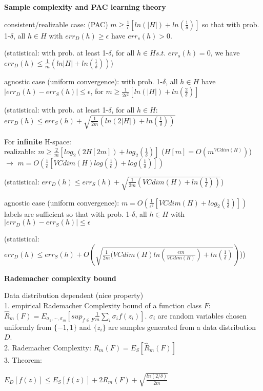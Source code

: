 \documentclass{article}
\begin{document}
\noindent
\textbf{Sample complexity and PAC learning theory}

consistent/realizable case: (PAC) $m \geq \frac{1}{\epsilon} [ln(|H|) + ln(\frac{1}{\delta})]$ so that with prob. 1-$\delta$, all $h \in H$ with $err_D(h) \geq \epsilon$ have $err_s(h) > 0$.

(statistical: with prob. at least 1-$\delta$, for all $h \in H s.t. $ $err_s(h)=0$, we have $err_D(h) \leq \frac{1}{m}(ln|H| + ln(\frac{1}{\delta}))$)

\noindent
agnostic case (uniform convergence): with prob. 1-$\delta$, all $h \in H$ have $|err_D(h)-err_S(h)| \leq \epsilon$, for $m \geq \frac{1}{2\epsilon^2}[ln(|H|) + ln(\frac{2}{\delta})]$

(statistical: with prob. at least 1-$\delta$, for all $h \in H$: $err_D(h) \leq err_S(h) + \sqrt{\frac{1}{2m}(ln(2|H|) + ln(\frac{1}{\delta}))}$

For \textbf{infinite} H-space:\\
realizable: $m \geq \frac{2}{m}[log_2(2H[2m]) + log_2(\frac{1}{\delta})]$ ($H[m] = O(m^{VCdim(H)})$) $\rightarrow$ $m=O(\frac{1}{\epsilon}[VCdim(H)log(\frac{1}{\epsilon}) + log(\frac{1}{\delta})])$

(statistical: $err_D(h) \leq err_S(h) + \sqrt{\frac{1}{2m}(VCdim(H) + ln(\frac{1}{\delta}))}$)

\noindent
agnostic case (uniform convergence): $m = O( \frac{1}{\epsilon^2}[VCdim(H) + log_2(\frac{1}{\delta})])$ labels are sufficient so that with prob. 1-$\delta$, all $h \in H$ with $|err_D(h)-err_S(h)| \leq \epsilon$

(statistical: $err_D(h) \leq err_S(h) + O(\sqrt{\frac{1}{2m}(VCdim(H)ln(\frac{em}{VCdim(H)}) + ln(\frac{1}{\delta})})$))

\noindent
\textbf{Rademacher complexity bound}

Data distribution dependent (nice property) \\
 1. empirical Rademacher Complexity bound of a function class $F$: $\hat{R}_m(F) = E_{\sigma_1, \cdots, \sigma_m}[sup_{f \in F} \frac{1}{m} \sum_{i} \sigma_i f(z_i)]$.  $\sigma_i$ are random variables chosen uniformly from $\{-1,1\}$ and $\{z_i\}$ are samples generated from a data distribution $D$. \\
 2. Rademacher Complexity: $R_m(F) = E_S[\hat{R}_m(F)]$ \\
 3. Theorem:
 
 $E_D[f(z)] \leq E_S[f(z)] + 2R_m(F) + \sqrt{\frac{ln(2/\delta)}{2m}}$ 
 
\end{document}
